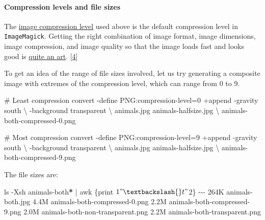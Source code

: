 \documentclass[
  a4paper,
]{article}
\newenvironment{Shaded}{\begin{snugshade}}{\end{snugshade}}
\newcommand{\AttributeTok}[1]{\textcolor[rgb]{0.80,0.80,0.80}{#1}}
\newcommand{\CommentTok}[1]{\textcolor[rgb]{0.50,0.62,0.50}{#1}}
\newcommand{\DataTypeTok}[1]{\textcolor[rgb]{0.87,0.87,0.75}{#1}}
\newcommand{\ExtensionTok}[1]{\textcolor[rgb]{0.80,0.80,0.80}{#1}}
\newcommand{\FunctionTok}[1]{\textcolor[rgb]{0.94,0.94,0.56}{#1}}
\newcommand{\KeywordTok}[1]{\textcolor[rgb]{0.94,0.87,0.69}{#1}}
\newcommand{\NormalTok}[1]{\textcolor[rgb]{0.80,0.80,0.80}{#1}}
\newcommand{\PreprocessorTok}[1]{\textcolor[rgb]{1.00,0.81,0.69}{\textbf{#1}}}
\newcommand{\StringTok}[1]{\textcolor[rgb]{0.80,0.58,0.58}{#1}}
\begin{document}
\hypertarget{compression-levels-and-file-sizes}{%
\paragraph{Compression levels and file
sizes}\label{compression-levels-and-file-sizes}}

The \href{https://en.wikipedia.org/wiki/Image_compression}{image
compression level} used above is the default compression level in
\texttt{ImageMagick}. Getting the right combination of image format,
image dimensions, image compression, and image quality so that the image
loads fast and looks good is
\href{https://www.smashingmagazine.com/2015/06/efficient-image-resizing-with-imagemagick/}{quite
an art}. {[}\protect\hyperlink{ref-newton2015}{4}{]}

To get an idea of the range of file sizes involved, let us try
generating a composite image with extremes of the compression level,
which can range from 0 to 9.

\begin{Shaded}
\begin{Highlighting}[]
\CommentTok{\# Least compression}
\ExtensionTok{convert} \AttributeTok{{-}define}\NormalTok{ PNG:compression{-}level=0 +append }\AttributeTok{{-}gravity}\NormalTok{ south }\DataTypeTok{\textbackslash{}}
\NormalTok{{-}background transparent }\DataTypeTok{\textbackslash{}}
\NormalTok{animals.jpg animals{-}halfsize.jpg }\DataTypeTok{\textbackslash{}}
\NormalTok{animals{-}both{-}compressed{-}0.png}

\CommentTok{\# Most compression}
\ExtensionTok{convert} \AttributeTok{{-}define}\NormalTok{ PNG:compression{-}level=9 +append }\AttributeTok{{-}gravity}\NormalTok{ south }\DataTypeTok{\textbackslash{}}
\NormalTok{{-}background transparent }\DataTypeTok{\textbackslash{}}
\NormalTok{animals.jpg animals{-}halfsize.jpg }\DataTypeTok{\textbackslash{}}
\NormalTok{animals{-}both{-}compressed{-}9.png}
\end{Highlighting}
\end{Shaded}

The file sizes are:

\begin{Shaded}
\begin{Highlighting}[]
\FunctionTok{ls} \AttributeTok{{-}Xsh}\NormalTok{ animals{-}both}\PreprocessorTok{*} \KeywordTok{|} \FunctionTok{awk} \StringTok{\textquotesingle{}\{print $1 "\textbackslash{}t" $2\}\textquotesingle{}}
\ExtensionTok{{-}{-}{-}}
\ExtensionTok{264K}\NormalTok{    animals{-}both.jpg}
\ExtensionTok{4.4M}\NormalTok{    animals{-}both{-}compressed{-}0.png}
\ExtensionTok{2.2M}\NormalTok{    animals{-}both{-}compressed{-}9.png}
\ExtensionTok{2.0M}\NormalTok{    animals{-}both{-}non{-}transparent.png}
\ExtensionTok{2.2M}\NormalTok{    animals{-}both{-}transparent.png}
\end{Highlighting}
\end{Shaded}
\end{document}
